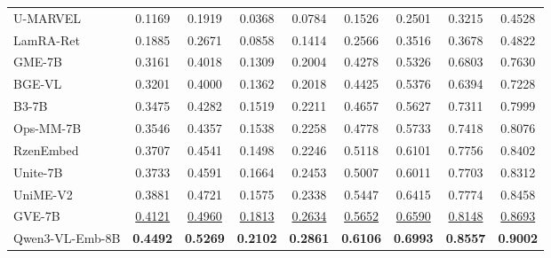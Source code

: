 \begin{table}[t]
\begin{tabular}{@{}l*{8}{c}@{}}
\midrule
U-MARVEL                & 0.1169 & 0.1919 & 0.0368 & 0.0784 & 0.1526 & 0.2501 & 0.3215 & 0.4528 \\
LamRA-Ret               & 0.1885 & 0.2671 & 0.0858 & 0.1414 & 0.2566 & 0.3516 & 0.3678 & 0.4822 \\
GME-7B                  & 0.3161 & 0.4018 & 0.1309 & 0.2004 & 0.4278 & 0.5326 & 0.6803 & 0.7630 \\
BGE-VL                  & 0.3201 & 0.4000 & 0.1362 & 0.2018 & 0.4425 & 0.5376 & 0.6394 & 0.7228 \\
B3-7B                   & 0.3475 & 0.4282 & 0.1519 & 0.2211 & 0.4657 & 0.5627 & 0.7311 & 0.7999 \\
Ops-MM-7B               & 0.3546 & 0.4357 & 0.1538 & 0.2258 & 0.4778 & 0.5733 & 0.7418 & 0.8076 \\
RzenEmbed               & 0.3707 & 0.4541 & 0.1498 & 0.2246 & 0.5118 & 0.6101 & 0.7756 & 0.8402 \\
Unite-7B                & 0.3733 & 0.4591 & 0.1664 & 0.2453 & 0.5007 & 0.6011 & 0.7703 & 0.8312 \\
UniME-V2                & 0.3881 & 0.4721 & 0.1575 & 0.2338 & 0.5447 & 0.6415 & 0.7774 & 0.8458 \\
GVE-7B                  & \underline{0.4121} & \underline{0.4960} & \underline{0.1813} & \underline{0.2634} & \underline{0.5652} & \underline{0.6590} & \underline{0.8148} & \underline{0.8693} \\
Qwen3-VL-Emb-8B         & \textbf{0.4492} & \textbf{0.5269} & \textbf{0.2102} & \textbf{0.2861} & \textbf{0.6106} & \textbf{0.6993} & \textbf{0.8557} & \textbf{0.9002} \\
\bottomrule
\end{tabular}
\end{table}

